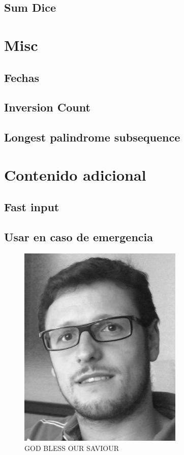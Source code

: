 \documentclass[oneside]{book}
\begin{document}
	\section{Sum Dice}
	
	\chapter{Misc}
	\section{Fechas}
	
	\section{Inversion Count}
	
	\section{Longest palindrome subsequence}
	
	
	\chapter{Contenido adicional}
	\section{Fast input}
	
	\newpage
	\section{Usar en caso de emergencia}
	\begin{figure}[h]
		\centering
		\includegraphics[width=0.7\textwidth]{foto}
		\caption*{GOD BLESS OUR SAVIOUR}
	\end{figure}
	\backmatter
	\printindex
\end{document}
